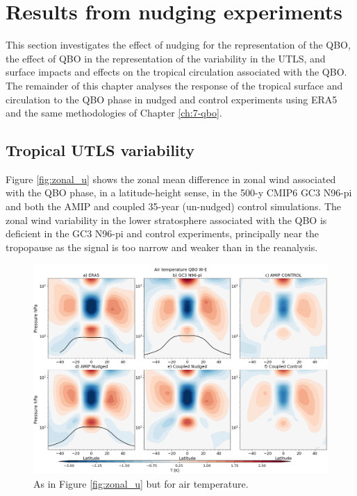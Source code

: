 \section{ Results from nudging experiments}

This section investigates the effect of nudging for the representation of the QBO, the effect of QBO in the representation of the variability in the UTLS, and  surface impacts and effects on the tropical circulation associated with the QBO.
The remainder of this chapter analyses the response of the tropical surface and circulation to the QBO phase in nudged and control experiments using ERA5 and the same methodologies of Chapter \ref{ch:7-qbo}.


\subsection{Tropical UTLS variability}

Figure \ref{fig:zonal_u} shows the zonal mean difference in zonal wind associated with the QBO phase, in a latitude-height sense, in the 500-y CMIP6 GC3 N96-pi and both the AMIP and coupled 35-year (un-nudged) control simulations. The zonal wind variability in the lower stratosphere associated with the QBO is deficient in the GC3 N96-pi and control experiments, principally near the tropopause as the signal is too narrow and weaker than in the reanalysis.
 
\begin{figure}[t!]
\centering
 \includegraphics[width=\linewidth]{figures/zonalplotair_temperature.png}
\caption[Zonal mean air temperature QBO difference]{As in Figure \ref{fig:zonal_u} but for air temperature.  }
\label{fig:zonal_T}
\end{figure} 

